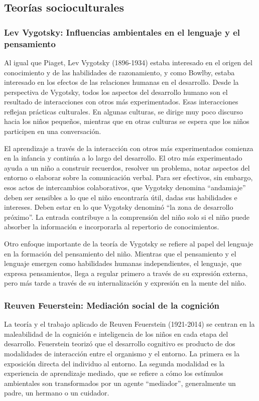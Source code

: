 \documentclass[11pt,letterpaper]{report}
\begin{document}
\subsection{Teorías socioculturales}
\subsubsection{Lev Vygotsky: Influencias ambientales en el lenguaje y el pensamiento}
Al igual que Piaget, Lev Vygotsky (1896-1934) estaba interesado en el origen
del conocimiento y de las habilidades de razonamiento, y como Bowlby, estaba
interesado en los efectos de las relaciones humanas en el desarrollo. Desde la
perspectiva de Vygotsky, todos los aspectos del desarrollo humano son el
resultado de interacciones con otros más experimentados. Esas interacciones
reflejan prácticas culturales. En algunas culturas, se dirige muy poco discurso
hacia los niños pequeños, mientras que en otras culturas se espera que los
niños participen en una conversación. \cite{Feldman3}

El aprendizaje a través de la interacción con otros más experimentados comienza
en la infancia y continúa a lo largo del desarrollo. El otro más experimentado
ayuda a un niño a construir recuerdos, resolver un problema, notar aspectos del
entorno o elaborar sobre la comunicación verbal. Para ser efectivos, sin
embargo, esos actos de intercambios colaborativos, que Vygotsky denomina
``andamiaje'' deben ser sensibles a lo que el niño encontraría útil, dadas sus
habilidades e intereses. Deben estar en lo que Vygotsky denominó ``la zona de
desarrollo próximo''. La entrada contribuye a la comprensión del niño solo si
el niño puede absorber la información e incorporarla al repertorio de
conocimientos. \cite{Feldman3}

Otro enfoque importante de la teoría de Vygotsky se refiere al papel del
lenguaje en la formación del pensamiento del niño. Mientras que el pensamiento
y el lenguaje emergen como habilidades humanas independientes, el lenguaje, que
expresa pensamientos, llega a regular primero a través de su expresión externa,
pero más tarde a través de su internalización y expresión en la mente del niño.
\cite{Feldman3}

\subsubsection{Reuven Feuerstein: Mediación social de la cognición}
La teoría y el trabajo aplicado de Reuven Feuerstein (1921-2014) se centran en
la maleabilidad de la cognición e inteligencia de los niños en cada etapa del
desarrollo. Feuerstein teorizó que el desarrollo cognitivo es producto de dos
modalidades de interacción entre el organismo y el entorno. La primera es la
exposición directa del individuo al entorno. La segunda modalidad es la
experiencia de aprendizaje mediado, que se refiere a cómo los estímulos
ambientales son transformados por un agente ``mediador'', generalmente un
padre, un hermano o un cuidador. \cite{Feldman3}
\end{document}
